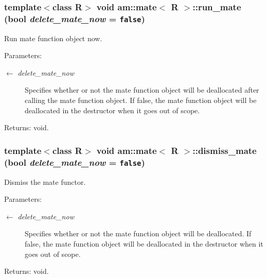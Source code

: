 \subsubsection{\setlength{\rightskip}{0pt plus 5cm}template$<$class R$>$ void {\bf am::mate}$<$ R $>$::run\_\-mate (bool {\em delete\_\-mate\_\-now} = {\tt false})\hspace{0.3cm}{\tt  [inline]}}\label{classam_1_1mate_93fe5fc5abbe71780e7638bde72e1845}


Run mate function object now.

\begin{Desc}
\item[Parameters:]
\begin{description}
\item[\mbox{$\leftarrow$} {\em delete\_\-mate\_\-now}]Specifies whether or not the mate function object will be deallocated after calling the mate function object. If false, the mate function object will be deallocated in the destructor when it goes out of scope. \end{description}
\end{Desc}
\begin{Desc}
\item[Returns:]void. \end{Desc}
\subsubsection{\setlength{\rightskip}{0pt plus 5cm}template$<$class R$>$ void {\bf am::mate}$<$ R $>$::dismiss\_\-mate (bool {\em delete\_\-mate\_\-now} = {\tt false})\hspace{0.3cm}{\tt  [inline]}}\label{classam_1_1mate_2ecbeb01954567c013e9322aa5e8e0da}


Dismiss the mate functor.

\begin{Desc}
\item[Parameters:]
\begin{description}
\item[\mbox{$\leftarrow$} {\em delete\_\-mate\_\-now}]Specifies whether or not the mate function object will be deallocated. If false, the mate function object will be deallocated in the destructor when it goes out of scope. \end{description}
\end{Desc}
\begin{Desc}
\item[Returns:]void. \end{Desc}
